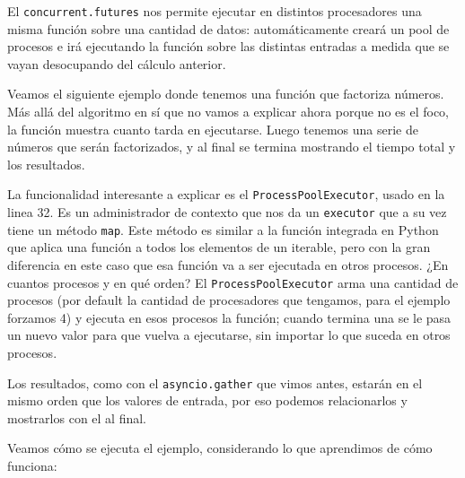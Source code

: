 El \texttt{concurrent.futures} nos permite ejecutar en distintos procesadores una misma función sobre una cantidad de datos: automáticamente creará un pool de procesos e irá ejecutando la función sobre las distintas entradas a medida que se vayan desocupando del cálculo anterior.

Veamos el siguiente ejemplo donde tenemos una función que factoriza números. Más allá del algoritmo en sí que no vamos a explicar ahora porque no es el foco, la función muestra cuanto tarda en ejecutarse. Luego tenemos una serie de números que serán factorizados, y al final se termina mostrando el tiempo total y los resultados.


La funcionalidad interesante a explicar es el \texttt{ProcessPoolExecutor}, usado en la linea 32. Es un administrador de contexto que nos da un \texttt{executor} que a su vez tiene un método \texttt{map}. Este método es similar a la función  integrada en Python que aplica una función a todos los elementos de un iterable, pero con la gran diferencia en este caso que esa función va a ser ejecutada en otros procesos. ¿En cuantos procesos y en qué orden? El \texttt{ProcessPoolExecutor} arma una cantidad de procesos (por default la cantidad de procesadores que tengamos, para el ejemplo forzamos 4) y ejecuta en esos procesos la función; cuando termina una se le pasa un nuevo valor para que vuelva a ejecutarse, sin importar lo que suceda en otros procesos.

Los resultados, como con el \texttt{asyncio.gather} que vimos antes, estarán en el mismo orden que los valores de entrada, por eso podemos relacionarlos y mostrarlos con el  al final.

Veamos cómo se ejecuta el ejemplo, considerando lo que aprendimos de cómo funciona:


